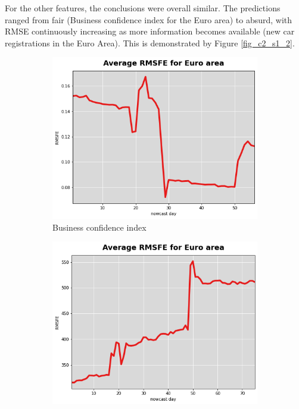 For the other features, the conclusions were overall similar. The predictions ranged from fair (Business confidence index for the Euro area) to absurd, with RMSE continuously increasing as more information becomes available (new car registrations in the Euro Area). This is demonstrated by Figure \ref{fig_c2_s1_2}.

\begin{figure} [H]

	\centering

	\begin{subfigure}[t]{0.43\textwidth}

		\centering

		\includegraphics[width=\linewidth]{images/rmse_business_ea.png}

		\caption{Business confidence index}
	\end{subfigure} 	\hspace{1cm}
	\begin{subfigure}[t]{0.43\textwidth}

		\centering

		\includegraphics[width=\linewidth]{images/rmse_car_ea.png}


\end{subfigure}
\end{figure}
